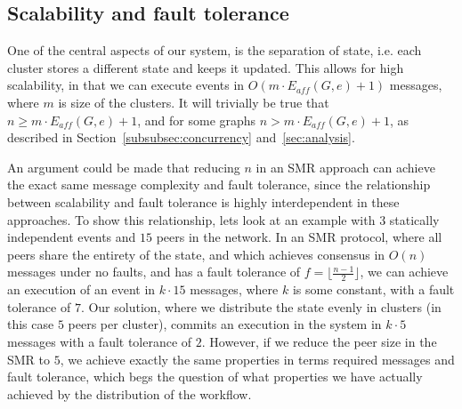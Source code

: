 \documentclass{article}
\begin{document}
	\subsection{Scalability and fault tolerance}

    One of the central aspects of our system, is the separation of state, i.e. each cluster stores a different state and keeps it updated.
   	This allows for high scalability, in that we can execute events in $O(m \cdot E_{aff}(G,e) + 1)$ messages, where $m$ is size of the clusters.
   	It will trivially be true that $n \geq m \cdot E_{aff}(G,e) + 1$, and for some graphs $n > m \cdot E_{aff}(G,e) + 1$, as described in Section~\ref{subsubsec:concurrency} and~\ref{sec:analysis}.

    An argument could be made that reducing $n$ in an SMR approach can achieve the exact same message complexity and fault tolerance, since the relationship between scalability and fault tolerance is highly interdependent in these approaches.
    To show this relationship, lets look at an example with $3$ statically independent events and $15$ peers in the network.
    In an SMR protocol, where all peers share the entirety of the state, and which achieves consensus in $O(n)$ messages under no faults, and has a fault tolerance of $f = \lfloor \frac{n-1}{2} \rfloor$, we can achieve an execution of an event in $k \cdot 15$ messages, where $k$ is some constant, with a fault tolerance of $7$.
    Our solution, where we distribute the state evenly in clusters (in this case $5$ peers per cluster), commits an execution in the system in $k \cdot 5$ messages with a fault tolerance of $2$.
    However, if we reduce the peer size in the SMR to $5$, we achieve exactly the same properties in terms required messages and fault tolerance, which begs the question of what properties we have actually achieved by the distribution of the workflow.
\end{document}
